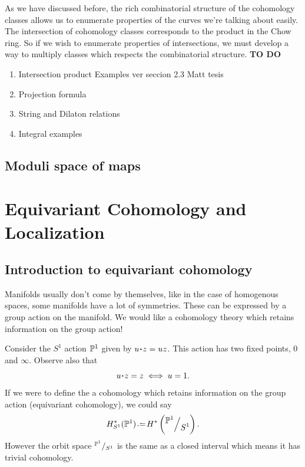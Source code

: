 \documentclass[12pt]{memoir}
\begin{document}
As we have discussed before, the rich combinatorial structure of the cohomology classes allows us to enumerate properties of the curves we're talking about easily. The intersection of cohomology classes corresponds to the product in the Chow ring. So if we wish to enumerate properties of intersections, we must develop a way to multiply classes which respects the combinatorial structure. 
\textbf{TO DO}
\begin{enumerate}
   
    \item Intersection product Examples ver seccion 2.3 Matt tesis
    \item Projection formula
    \item String and Dilaton relations
    \item Integral examples
\end{enumerate}

\section{Moduli space of maps}

\chapter{Equivariant Cohomology and Localization}

\section{Introduction to equivariant cohomology}

Manifolds usually don't come by themselves, like in the case of homogenous spaces, some manifolds have a lot of symmetries. These can be expressed by a group action on the manifold. We would like a cohomology theory which retains information on the group action!

\begin{Ex}
    Consider the $S^1$ action $\mathbb{P}^1$ given by $u\. z=uz$. This action has two fixed points, $0$ and $\infty$. Observe also that 
    $$u\.z=z\iff u=1.$$
    If we were to define the a cohomology which retains information on the group action (equivariant cohomology), we could say 
    $$H_{S^1}^\ast(\bP^1)\defeq H^\ast\left(\quot{\bP^1}{S^1}\right).$$
    However the orbit space $\quot{\bP^1}{S^1}$ is the same as a closed interval which means it has trivial cohomology.
\end{Ex}
\end{document}
